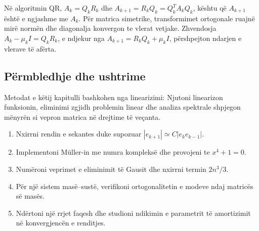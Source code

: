 Në algoritmin QR, $A_k=Q_kR_k$ dhe $A_{k+1}=R_kQ_k=Q_k^TA_kQ_k$, kështu që $A_{k+1}$ është e ngjashme me $A_k$. Për matrica simetrike, transformimet ortogonale ruajnë mirë normën dhe diagonalja konvergon te vlerat vetjake. Zhvendosja $A_k-\mu_kI=Q_kR_k$, e ndjekur nga $A_{k+1}=R_kQ_k+\mu_kI$, përshpejton ndarjen e vlerave të afërta.

\subsection{Përmbledhje dhe ushtrime}
Metodat e këtij kapitulli bashkohen nga linearizimi: Njutoni linearizon funksionin, eliminimi zgjidh problemin linear dhe analiza spektrale shpjegon mënyrën si vepron matrica në drejtime të veçanta.
\begin{enumerate}
\item Nxirrni rendin e sekantes duke supozuar $|e_{k+1}|\simeq C|e_k e_{k-1}|$.
\item Implementoni Müller-in me numra kompleksë dhe provojeni te $x^4+1=0$.
\item Numëroni veprimet e eliminimit të Gausit dhe nxirrni termin $2n^3/3$.
\item Për një sistem masë--sustë, verifikoni ortogonalitetin e modeve ndaj matricës së masës.
\item Ndërtoni një rrjet faqesh dhe studioni ndikimin e parametrit të amortizimit në konvergjencën e renditjes.
\end{enumerate}
